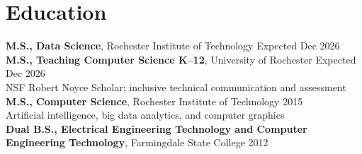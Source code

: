 \documentclass[10pt,letterpaper]{article}
\begin{document}
\section*{Education}
\textbf{M.S., Data Science}, Rochester Institute of Technology
\hfill Expected Dec 2026\\
\textbf{M.S., Teaching Computer Science K--12}, University of Rochester
\hfill Expected Dec 2026\\
NSF Robert Noyce Scholar; inclusive technical communication and assessment\\
\textbf{M.S., Computer Science}, Rochester Institute of Technology \hfill 2015\\
Artificial intelligence, big data analytics, and computer graphics\\
\textbf{Dual B.S., Electrical Engineering Technology and Computer Engineering Technology},
Farmingdale State College \hfill 2012
\end{document}
